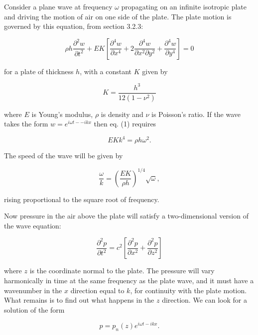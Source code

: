   Consider a plane wave at frequency $\omega$ propagating on an infinite 
  isotropic plate and driving the motion of air on one side of the plate. The 
  plate motion is governed by this equation, from section 3.2.3: 

  \begin{equation*}\rho h \dfrac{\partial^2 w}{\partial t^2}+EK 
  \left[\frac{\partial^4 w}{\partial x^4}+2\frac{\partial^4 w}{\partial x^2 
  \partial y^2} +\frac{\partial^4 w}{\partial y^4} 
  \right]=0\tag{1}\end{equation*} 

  \noindent{}for a plate of thickness $h$, with a constant $K$ given by 

  \begin{equation*}K=\frac{h^3}{12(1-\nu^2)} \tag{2}\end{equation*} 

  \noindent{}where $E$ is Young's modulus, $\rho$ is density and $\nu$ is 
  Poisson's ratio. If the wave takes the form $w=e^{i \omega t -- i k x}$ then 
  eq. (1) requires 

  \begin{equation*}EK k^4=\rho h \omega^2. \tag{3}\end{equation*} 

  The speed of the wave will be given by 

  \begin{equation*}\frac{\omega}{k} = \left( \dfrac{EK}{\rho h} \right)^{1/4} 
  \sqrt{\omega} ,\tag{4}\end{equation*} 

  \noindent{}rising proportional to the square root of frequency. 

  Now pressure in the air above the plate will satisfy a two-dimensional 
  version of the wave equation: 

  \begin{equation*}\frac{\partial^2 p}{\partial t^2}= c^2 \left[ 
  \frac{\partial^2 p}{\partial x^2} + \frac{\partial^2 p}{\partial z^2} \right] 
  \tag{5}\end{equation*} 

  \noindent{}where $z$ is the coordinate normal to the plate. The pressure will 
  vary harmonically in time at the same frequency as the plate wave, and it 
  must have a wavenumber in the $x$ direction equal to $k$, for continuity with 
  the plate motion. What remains is to find out what happens in the $z$ 
  direction. We can look for a solution of the form 

  \begin{equation*}p=p_n(z) e^{i \omega t -i k x} . \tag{6}\end{equation*} 

